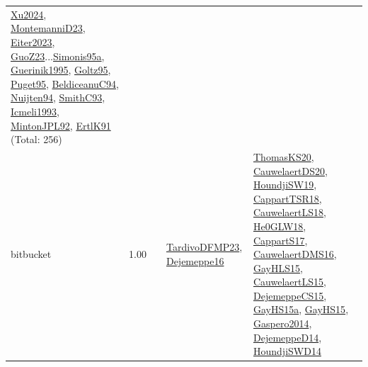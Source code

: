 {\begin{longtable}{p{3cm}r>{\raggedright\arraybackslash}p{6cm}>{\raggedright\arraybackslash}p{6cm}>{\raggedright\arraybackslash}p{8cm}}
\hyperref[detail:Xu2024]{Xu2024}, \hyperref[detail:MontemanniD23]{MontemanniD23}, \hyperref[detail:Eiter2023]{Eiter2023}, \hyperref[detail:GuoZ23]{GuoZ23}...\hyperref[detail:Simonis95a]{Simonis95a}, \hyperref[detail:Guerinik1995]{Guerinik1995}, \hyperref[detail:Goltz95]{Goltz95}, \hyperref[detail:Puget95]{Puget95}, \hyperref[detail:BeldiceanuC94]{BeldiceanuC94}, \hyperref[detail:Nuijten94]{Nuijten94}, \hyperref[detail:SmithC93]{SmithC93}, \hyperref[detail:Icmeli1993]{Icmeli1993}, \hyperref[detail:MintonJPL92]{MintonJPL92}, \hyperref[detail:ErtlK91]{ErtlK91} (Total: 256)\\
\index{bitbucket}\index{Benchmarks!bitbucket}bitbucket &  1.00 &  & \hyperref[detail:TardivoDFMP23]{TardivoDFMP23}, \hyperref[detail:Dejemeppe16]{Dejemeppe16} & \hyperref[detail:ThomasKS20]{ThomasKS20}, \hyperref[detail:CauwelaertDS20]{CauwelaertDS20}, \hyperref[detail:HoundjiSW19]{HoundjiSW19}, \hyperref[detail:CappartTSR18]{CappartTSR18}, \hyperref[detail:CauwelaertLS18]{CauwelaertLS18}, \hyperref[detail:He0GLW18]{He0GLW18}, \hyperref[detail:CappartS17]{CappartS17}, \hyperref[detail:CauwelaertDMS16]{CauwelaertDMS16}, \hyperref[detail:GayHLS15]{GayHLS15}, \hyperref[detail:CauwelaertLS15]{CauwelaertLS15}, \hyperref[detail:DejemeppeCS15]{DejemeppeCS15}, \hyperref[detail:GayHS15a]{GayHS15a}, \hyperref[detail:GayHS15]{GayHS15}, \hyperref[detail:Gaspero2014]{Gaspero2014}, \hyperref[detail:DejemeppeD14]{DejemeppeD14}, \hyperref[detail:HoundjiSWD14]{HoundjiSWD14}\\

\end{longtable}}
